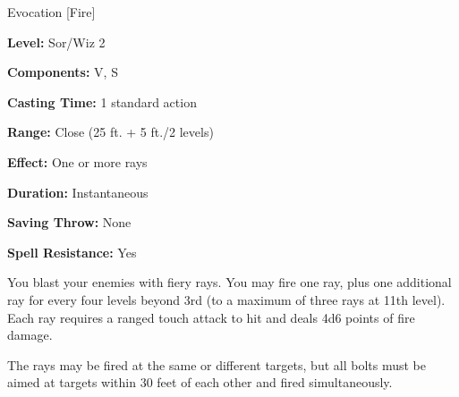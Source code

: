 
Evocation [Fire]

\textbf{Level:} Sor/Wiz 2

\textbf{Components:} V, S

\textbf{Casting Time:} 1 standard action

\textbf{Range:} Close (25 ft. + 5 ft./2 levels)

\textbf{Effect:} One or more rays

\textbf{Duration:} Instantaneous

\textbf{Saving Throw:} None

\textbf{Spell Resistance:} Yes

You blast your enemies with fiery rays. You may fire one ray, plus one additional 
ray for every four levels beyond 3rd (to a maximum of three rays at 11th level). 
Each ray requires a ranged touch attack to hit and deals 4d6 points of fire damage.

The rays may be fired at the same or different targets, but all bolts must be aimed 
at targets within 30 feet of each other and fired simultaneously.

